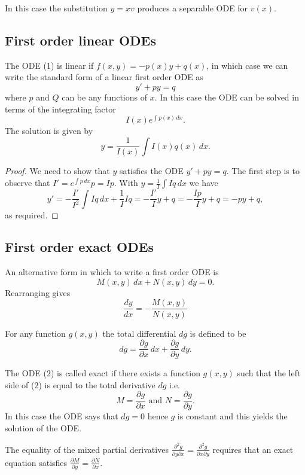 \documentclass[10pt, a4paper]{article}
\begin{document}
In this case the substitution $y = xv$ produces a separable ODE for $v(x)$.

\subsection{First order linear ODEs}
The ODE (1) is linear if $f(x, y) = -p(x)y + q(x)$,
in which case we can write the standard form of a linear first order ODE as
\[
y' + py = q
\]
where $p$ and $Q$ can be any functions of $x$.
In this case the ODE can be solved in terms of the integrating factor
\[
I(x) e ^ {\int p(x)\,dx}.
\]
The solution is given by
\[
y = \frac{1}{I(x)}\int I(x)q(x)\,dx.
\]
\begin{proof}
    We need to show that $y$ satisfies the ODE $y' + py = q$.
    The first step is to observe that $I' = e ^ {\int p\,dx}p = Ip$.
    With $y = \frac{1}{I}\int Iq\,dx$ we have
    \[
    y' = -\frac{I'}{I ^ 2}\int Iq\,dx + \frac{1}{I}Iq = -\frac{I'}{I}y + q = -\frac{Ip}{I}y + q = -py + q,
    \]
    as required.
\end{proof}

\subsection{First order exact ODEs}
An alternative form in which to write a first order ODE is
\begin{equation}
    M(x, y)\,dx + N(x, y)\,dy = 0.
\end{equation}
Rearranging gives
\[
\frac{dy}{dx} = -\frac{M(x, y)}{N(x, y)}
\]

For any function $g(x, y)$ the total differential $dg$ is defined to be
\[
dg = \frac{\partial g}{\partial x}\,dx + \frac{\partial g}{\partial y}\,dy.
\]

The ODE ($2$) is called exact if there exists a function $g(x, y)$ such that the left side of ($2$) is equal to the total derivative $dg$ i.e.
\[
M = \frac{\partial g}{\partial x}\text{ and } N = \frac{\partial g}{\partial y}.
\]
In this case the ODE says that $dg = 0$ hence $g$ is constant and this yields the solution of the ODE.

The equality of the mixed partial derivatives $\frac{\partial ^ 2 g}{\partial y \partial x} = \frac{\partial ^ 2 g}{\partial x \partial y}$ requires that an exact equation satisfies $\frac{\partial M}{\partial y} = \frac{\partial N}{\partial x}$.
\end{document}
